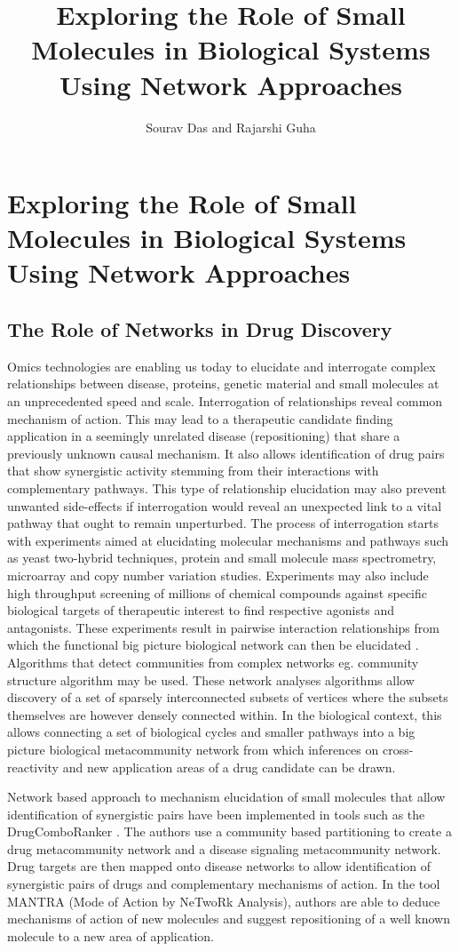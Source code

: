 \documentclass[]{book}
\title{Exploring the Role of Small Molecules in Biological Systems Using Network Approaches}
\author{Sourav Das and Rajarshi Guha}
\begin{document}
\frontmatter
\mainmatter

\chapter{Exploring the Role of Small Molecules in Biological Systems Using Network Approaches}

\section{The Role of Networks in Drug Discovery}  
\label{sec:role-networks-drug}
Omics technologies are enabling us today to elucidate and interrogate complex relationships between disease, proteins, genetic material and small molecules at an unprecedented speed and scale. Interrogation of relationships reveal common mechanism of action. This may lead to a therapeutic candidate finding application in a seemingly unrelated disease (repositioning) that share a previously unknown causal mechanism. It also allows identification of drug pairs that show synergistic activity stemming from their interactions with complementary pathways. This type of relationship elucidation may also prevent unwanted side-effects if interrogation would reveal an unexpected link to a vital pathway that ought to remain unperturbed. The process of interrogation starts with experiments aimed at elucidating molecular mechanisms and pathways such as yeast two-hybrid techniques, protein and small molecule mass spectrometry, microarray and copy number variation studies. Experiments may also include high throughput screening of millions of chemical compounds against specific biological targets of therapeutic interest to find respective agonists and antagonists. These experiments result in pairwise interaction relationships from which the functional big picture biological network can then be elucidated \cite{Wu2010}. Algorithms that detect communities from complex networks eg. community structure algorithm \cite{girvan2002community} may be used. These network analyses algorithms allow discovery of a set of sparsely interconnected subsets of vertices where the subsets themselves are however densely connected within. In the biological context, this allows connecting a set of biological cycles and smaller pathways into a big picture biological metacommunity network from which inferences on cross-reactivity and new application areas of a drug candidate can be drawn.

Network based approach to mechanism elucidation of small molecules that allow identification of synergistic pairs have been implemented in tools such as the DrugComboRanker \cite{huang2014drugcomboranker}. The authors use a community based partitioning to create a drug metacommunity network and a disease signaling metacommunity network. Drug targets are then mapped onto disease networks to allow identification of synergistic pairs of drugs and complementary mechanisms of action.
In the tool MANTRA (Mode of Action by NeTwoRk Analysis)\cite{iorio2010discovery}, authors are able to deduce mechanisms of action of new molecules and suggest repositioning of a well known molecule to a new area of application.
\end{document}
